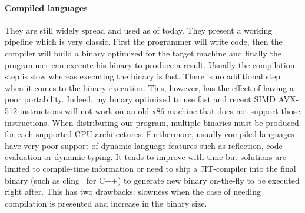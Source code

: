 \paragraph{Compiled languages} They are still widely spread and used as of today. They present a working pipeline which
is very classic. First the programmer will write code, then the compiler will build a binary optimized for the target
machine and finally the programmer can execute his binary to produce a result. Usually the compilation step is slow
whereas executing the binary is fast. There is no additional step when it comes to the binary execution. This, however,
has the effect of having a poor portability. Indeed, my binary optimized to use fast and recent SIMD AVX-512
instructions will not work on an old x86 machine that does not support those instructions. When distributing our
program, multiple binaries must be produced for each supported CPU architectures. Furthermore, usually compiled
languages have very poor support of dynamic language features such as reflection, code evaluation or dynamic typing. It
tends to improve with time but solutions are limited to compile-time information or need to ship a JIT-compiler into the
final binary (such as cling~\parencite{vassilev.2012.cling} for C++) to generate new binary on-the-fly to be executed
right after. This has two drawbacks: slowness when the case of needing compilation is presented and increase in the
binary size.

